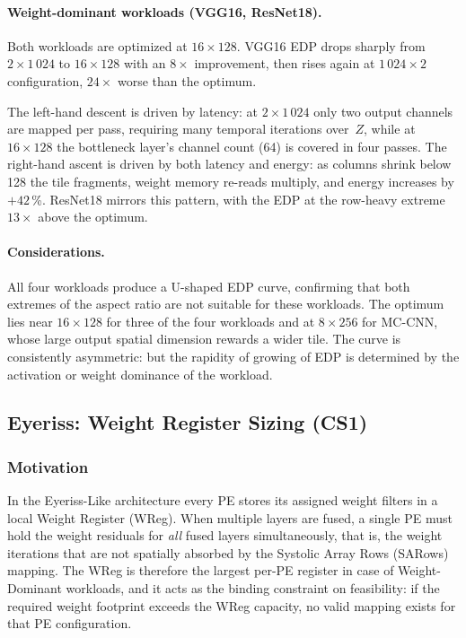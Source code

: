 \paragraph{Weight-dominant workloads (VGG16, ResNet18).}
Both workloads are optimized at $16 \times 128$.
VGG16 EDP drops sharply from $2 \times 1\,024$ to $16 \times 128$ with an $8\times$ improvement, then rises again at $1\,024 \times 2$ configuration, $24\times$ worse than the optimum.

The left-hand descent is driven by latency: at $2 \times 1\,024$ only
two output channels are mapped per pass, requiring many temporal
iterations over~$Z$, while at $16 \times 128$ the bottleneck layer's
channel count (64) is covered in four passes.
The right-hand ascent is driven by both latency and energy: as columns
shrink below 128 the tile fragments, weight memory re-reads multiply, and
energy increases by $+42$\,\%.
ResNet18 mirrors this pattern, with the EDP at the row-heavy extreme
$13\times$ above the optimum.

\paragraph{Considerations.}
All four workloads produce a U-shaped EDP curve, confirming that both
extremes of the aspect ratio are not suitable for these workloads.
The optimum lies near $16 \times 128$ for three of the four workloads
and at $8 \times 256$ for MC-CNN, whose large output spatial dimension
rewards a wider tile.
The curve is consistently asymmetric: but the rapidity of growing of EDP is determined by the activation or weight dominance of the workload.

\subsection{Eyeriss: Weight Register Sizing (CS1)}
\label{sec:eyeriss-cs1}

\subsubsection{Motivation}

In the Eyeriss-Like architecture every PE stores its assigned weight
filters in a local Weight Register (WReg).
When multiple layers are fused, a single PE must hold the weight
residuals for \emph{all} fused layers simultaneously, that is, the weight iterations
that are not spatially absorbed by the Systolic Array Rows (SARows) mapping.
The WReg is therefore the largest per-PE register in case of Weight-Dominant workloads, and it acts as the binding constraint on feasibility: if the required
weight footprint exceeds the WReg capacity, no valid mapping exists
for that PE configuration.


